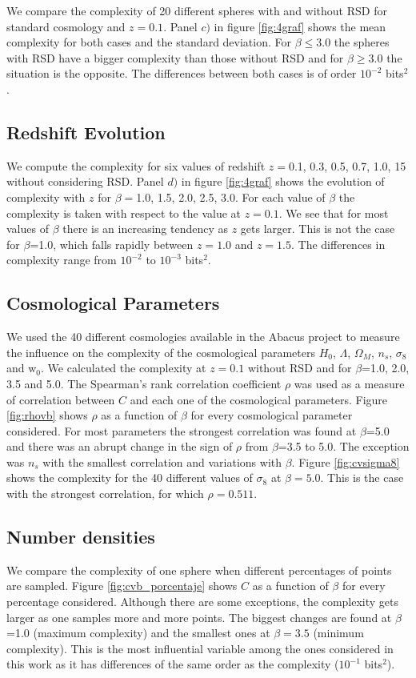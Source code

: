 \documentclass[fleqn,usenatbib]{mnras}
\begin{document}
We compare the complexity of 20 different spheres with and without RSD
for standard cosmology and $z=0.1$. Panel $c)$ in figure
\ref{fig:4graf} shows the mean complexity for both cases and the
standard deviation. For $\beta\leq3.0$ the spheres with RSD have a
bigger complexity than those without RSD and for $\beta\geq3.0$ the
situation is the opposite. The differences between both cases is of
order $10^{-2}$ bits$^2$. 


\subsection{Redshift Evolution}
We compute the complexity for six values of redshift $z=$0.1, 0.3,
0.5, 0.7, 1.0, 15 without considering RSD. Panel $d)$ in figure
\ref{fig:4graf} shows the evolution of complexity with $z$ for
$\beta=$1.0, 1.5, 2.0, 2.5, 3.0. For each value of $\beta$ the
complexity is taken with respect to the value at $z=0.1$. We see that
for most values of $\beta$ there is an increasing tendency as $z$ gets
larger. This is not the case for $\beta$=1.0, which falls rapidly
between $z=1.0$ and $z=1.5$. The differences in complexity range from
$10^{-2}$ to $10^{-3}$ bits$^2$. 

\subsection{Cosmological Parameters}
We used the 40 different cosmologies available in the Abacus project
to measure the influence on the complexity of the cosmological
parameters $H_0$, $\Lambda$, $\Omega_{M}$, $n_s$, $\sigma_8$ and
w$_0$. We calculated the complexity at $z=0.1$ without RSD and for
$\beta$=1.0, 2.0, 3.5 and 5.0.  The Spearman’s rank correlation
coefficient $\rho$ was used as a measure of correlation between $C$
and each one of the cosmological parameters. Figure \ref{fig:rhovb}
shows $\rho$ as a function of $\beta$ for every cosmological parameter
considered.  For most parameters the strongest correlation was found
at $\beta$=5.0 and there was an abrupt change in the sign of $\rho$
from $\beta$=3.5 to 5.0. The exception was $n_{s}$ with the smallest
correlation and variations with $\beta$. Figure \ref{fig:cvsigma8}
shows the complexity for the 40 different values of $\sigma_{8}$ at
$\beta=5.0$. This is the case with the strongest correlation, for
which $\rho=0.511$. 

\subsection{Number densities}
We compare the complexity of one sphere when different percentages of
points are sampled. Figure \ref{fig:cvb_porcentaje} shows $C$ as a
function of $\beta$ for every percentage considered. Although there
are some exceptions, the complexity gets larger as one samples more
and more points. The biggest changes are found at $\beta$=1.0 (maximum
complexity) and the smallest ones at $\beta=3.5$ (minimum
complexity). This is the most influential variable among the ones
considered in this work as it has differences of the same order as the
complexity ($10^{-1}$ bits$^2$). 
\end{document}
